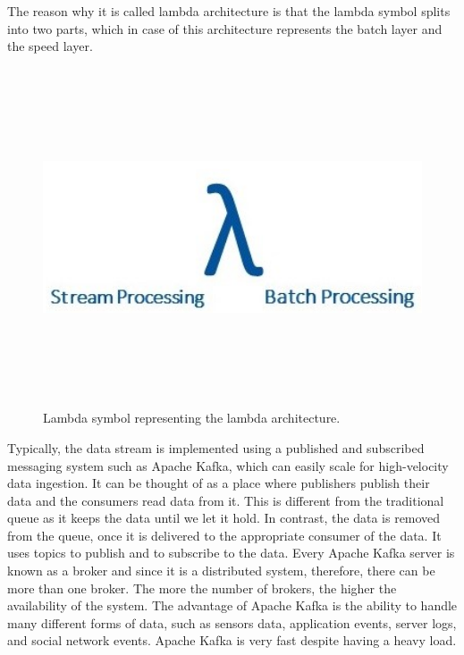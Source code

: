 The reason why it is called lambda architecture is that the lambda symbol splits into two parts, which in case of this architecture represents the batch layer and the speed layer. 

\begin{figure}[htpb]
	\centering
	\includegraphics[width=12cm,height=10cm,keepaspectratio=true]{images/lambda_new}
	\caption{
		Lambda symbol representing the lambda architecture.
	}
	\label{fig:lambda}
\end{figure}

Typically, the data stream is implemented using a published and subscribed messaging system such as Apache Kafka, which can easily scale for high-velocity data ingestion. It can be thought of as a place where publishers publish their data and the consumers read data from it. This is different from the traditional queue as it keeps the data until we let it hold. In contrast, the data is removed from the queue, once it is delivered to the appropriate consumer of the data. It uses topics to publish and to subscribe to the data. Every Apache Kafka server is known as a broker and since it is a distributed system, therefore, there can be more than one broker. The more the number of brokers, the higher the availability of the system. The advantage of Apache Kafka is the ability to handle many different forms of data, such as sensors data, application events, server logs, and social network events. Apache Kafka is very fast despite having a heavy load.

